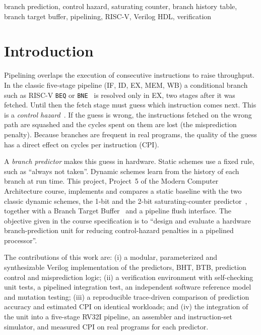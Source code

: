 \documentclass[conference]{IEEEtran}
\begin{document}
\begin{IEEEkeywords}
branch prediction, control hazard, saturating counter, branch history table, branch target
buffer, pipelining, RISC-V, Verilog HDL, verification
\end{IEEEkeywords}

\section{Introduction}
Pipelining overlaps the execution of consecutive instructions to raise throughput. In the classic
five-stage pipeline (IF, ID, EX, MEM, WB) a conditional branch such as RISC-V \texttt{BEQ} or
\texttt{BNE}~\cite{waterman2019riscv} is resolved only in EX, two stages after it was fetched.
Until then the fetch stage must guess which instruction comes next. This is a \emph{control
hazard}~\cite{hennessy2017ca,patterson2020cod}. If the guess is wrong, the instructions fetched
on the wrong path are squashed and the cycles spent on them are lost (the misprediction penalty).
Because branches are frequent in real programs, the quality of the guess has a direct effect on
cycles per instruction (CPI).

A \emph{branch predictor} makes this guess in hardware. Static schemes use a fixed rule, such as
``always not taken''. Dynamic schemes learn from the history of each branch at run time. This
project, Project~5 of the Modern Computer Architecture course, implements and compares a static
baseline with the two classic dynamic schemes, the 1-bit and the 2-bit saturating-counter
predictor~\cite{smith1981study}, together with a Branch Target Buffer~\cite{lee1984branch} and a
pipeline flush interface. The objective given in the course specification is to ``design and
evaluate a hardware branch-prediction unit for reducing control-hazard penalties in a pipelined
processor''.

The contributions of this work are: (i) a modular, parameterized and synthesizable Verilog
implementation of the predictors, BHT, BTB, prediction control and misprediction logic;
(ii) a verification environment with self-checking unit tests, a pipelined integration test,
an independent software reference model and mutation testing; (iii) a reproducible
trace-driven comparison of prediction accuracy and estimated CPI on identical workloads; and
(iv) the integration of the unit into a five-stage RV32I pipeline, an assembler and
instruction-set simulator, and measured CPI on real programs for each predictor.
\end{document}
